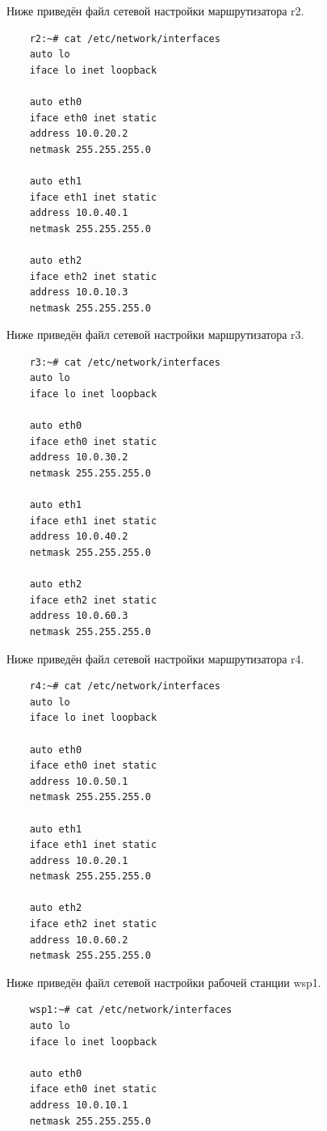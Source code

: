 \documentclass[a4paper,12pt]{article}
\begin{document}
Ниже приведён файл сетевой настройки  маршрутизатора r2.

\begin{Verbatim}
    r2:~# cat /etc/network/interfaces 
    auto lo
    iface lo inet loopback
    
    auto eth0
    iface eth0 inet static
    address 10.0.20.2
    netmask 255.255.255.0
    
    auto eth1
    iface eth1 inet static
    address 10.0.40.1
    netmask 255.255.255.0
    
    auto eth2
    iface eth2 inet static
    address 10.0.10.3
    netmask 255.255.255.0    
\end{Verbatim}

Ниже приведён файл сетевой настройки  маршрутизатора r3.

\begin{Verbatim}
    r3:~# cat /etc/network/interfaces 
    auto lo
    iface lo inet loopback
    
    auto eth0
    iface eth0 inet static
    address 10.0.30.2
    netmask 255.255.255.0
    
    auto eth1
    iface eth1 inet static
    address 10.0.40.2
    netmask 255.255.255.0
    
    auto eth2
    iface eth2 inet static
    address 10.0.60.3
    netmask 255.255.255.0      
\end{Verbatim}

Ниже приведён файл сетевой настройки  маршрутизатора r4.

\begin{Verbatim}
    r4:~# cat /etc/network/interfaces 
    auto lo
    iface lo inet loopback
    
    auto eth0
    iface eth0 inet static
    address 10.0.50.1
    netmask 255.255.255.0
    
    auto eth1
    iface eth1 inet static
    address 10.0.20.1
    netmask 255.255.255.0
    
    auto eth2
    iface eth2 inet static
    address 10.0.60.2
    netmask 255.255.255.0         
\end{Verbatim}

Ниже приведён файл сетевой настройки рабочей станции wsp1.

\begin{Verbatim}
    wsp1:~# cat /etc/network/interfaces 
    auto lo
    iface lo inet loopback
    
    auto eth0
    iface eth0 inet static
    address 10.0.10.1
    netmask 255.255.255.0    
\end{Verbatim}
\end{document}
